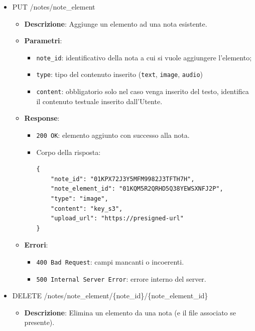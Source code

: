 \documentclass[a4paper,12pt]{article}
\newcommand{\code}[1]{{\ttfamily\textcolor{purple!85!black}{#1}}}
\begin{document}
\begin{itemize}
    \item \code{PUT /notes/note\_element}
        \begin{itemize}
            \item \textbf{Descrizione}: Aggiunge un elemento ad una nota esistente.

            \item \textbf{Parametri}:
            \begin{itemize}
                \item \texttt{note\_id}: identificativo della nota a cui si vuole aggiungere l'elemento;
                \item \texttt{type}: tipo del contenuto inserito (\texttt{text}, \texttt{image}, \texttt{audio})
                \item \texttt{content}: obbligatorio solo nel caso venga inserito del testo, identifica il contenuto testuale inserito dall'Utente.
            \end{itemize}

            \item \textbf{Response}:
            \begin{itemize}
                \item \texttt{200 OK}: elemento aggiunto con successo alla nota.
                \item Corpo della risposta:
\begin{verbatim}
{
    "note_id": "01KPX72J3Y5MFM9982J3TFTH7H",
    "note_element_id": "01KQM5R2QRHD5Q38YEWSXNFJ2P",
    "type": "image",
    "content": "key_s3",
    "upload_url": "https://presigned-url"
}
\end{verbatim}
            \end{itemize}

            \item \textbf{Errori}:
            \begin{itemize}
                \item \texttt{400 Bad Request}: campi mancanti o incoerenti.
                \item \texttt{500 Internal Server Error}: errore interno del server.
            \end{itemize}
        \end{itemize}

    \item \code{DELETE /notes/note\_element/\{note\_id\}/\{note\_element\_id\}}
        \begin{itemize}
            \item \textbf{Descrizione}: Elimina un elemento da una nota (e il file associato se presente).


\end{itemize}
\end{itemize}
\end{document}
